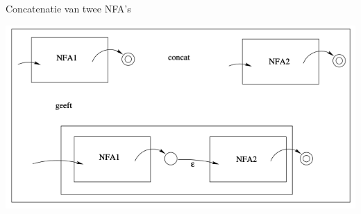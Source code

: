\begin{pro}{Concatenatie van twee NFA's}
\begin{minipage}{.6\textwidth}
    \end{minipage}
    \hspace{-0.5cm}
    \begin{minipage}{.36\textwidth}
        \includegraphics[scale = 0.28]{Images/ConcatNFA}
    \end{minipage}
\end{pro}

